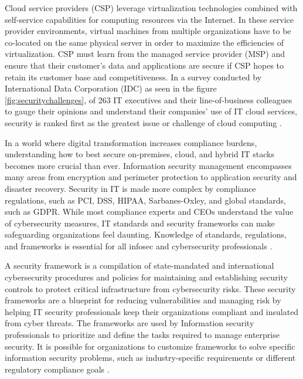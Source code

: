 {\par Cloud service providers (CSP) leverage virtualization technologies combined with self-service capabilities for computing resources via the Internet. In these service provider environments, virtual machines from multiple organizations have to be co-located on the same physical server in order to maximize the efficiencies of virtualization. CSP must learn from the managed service provider (MSP) and ensure that their customer’s data and applications are secure if CSP hopes to retain its customer base and competitiveness. In a survey conducted by International Data Corporation (IDC) as seen in the figure \ref{fig:securitychallenges}, of 263 IT executives and their line-of-business colleagues to gauge their opinions and understand their companies’ use of IT cloud services, security is ranked first as the greatest issue or challenge of cloud computing \cite{41}.

\par In a world where digital transformation increases compliance burdens, understanding how to best secure on-premises, cloud, and hybrid IT stacks becomes more crucial than ever. Information security management encompasses many areas from encryption and perimeter protection to application security and disaster recovery. Security in IT is made more complex by compliance regulations, such as PCI, DSS, HIPAA, Sarbanes-Oxley, and global standards, such as GDPR. While most compliance experts and CEOs understand the value of cybersecurity measures, IT standards and security frameworks can make safeguarding organizations feel daunting. Knowledge of standards, regulations, and frameworks is essential for all infosec and cybersecurity professionals \cite{89}.

\par A security framework is a compilation of state-mandated and international cybersecurity procedures and policies for maintaining and establishing security controls to protect critical infrastructure from cybersecurity risks. These security frameworks are a blueprint for reducing vulnerabilities and managing risk by helping IT security professionals keep their organizations compliant and insulated from cyber threats. The frameworks are used by Information security professionals to prioritize and define the tasks required to manage enterprise security. It is possible for organizations to customize frameworks to solve specific information security problems, such as industry-specific requirements or different regulatory compliance goals \cite{89}.

}

